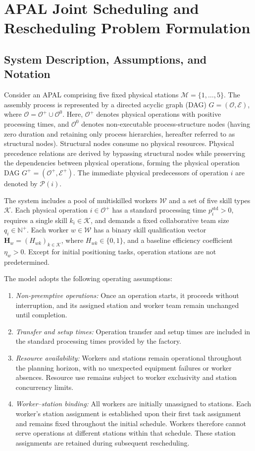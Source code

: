 \documentclass[journal,10pt]{IEEEtran}
\begin{document}
\section{APAL Joint Scheduling and Rescheduling Problem Formulation}\label{sec:formulation}

\subsection{System Description, Assumptions, and Notation}

Consider an APAL comprising five fixed physical stations $\mathcal{M}=\{1,\dots,5\}$. The assembly process is represented by a directed acyclic graph (DAG) $G=(\mathcal{O},\mathcal{E})$, where $\mathcal{O}=\mathcal{O}^+\cup\mathcal{O}^0$. Here, $\mathcal{O}^+$ denotes physical operations with positive processing times, and $\mathcal{O}^0$ denotes non-executable process-structure nodes (having zero duration and retaining only process hierarchies, hereafter referred to as structural nodes). Structural nodes consume no physical resources. Physical precedence relations are derived by bypassing structural nodes while preserving the dependencies between physical operations, forming the physical operation DAG $G^+=(\mathcal{O}^+,\mathcal{E}^+)$. The immediate physical predecessors of operation $i$ are denoted by $\mathcal{P}(i)$.

The system includes a pool of multiskilled workers $\mathcal{W}$ and a set of five skill types $\mathcal{K}$. Each physical operation $i\in\mathcal{O}^+$ has a standard processing time $p_i^{\mathrm{std}}>0$, requires a single skill $k_i\in\mathcal{K}$, and demands a fixed collaborative team size $q_i\in\mathbb{N}^+$. Each worker $w\in\mathcal{W}$ has a binary skill qualification vector $\mathbf{H}_w=(H_{wk})_{k\in\mathcal{K}}$, where $H_{wk}\in\{0,1\}$, and a baseline efficiency coefficient $\eta_w>0$. Except for initial positioning tasks, operation stations are not predetermined.

The model adopts the following operating assumptions:
\begin{enumerate}
\item \textit{Non-preemptive operations:} Once an operation starts, it proceeds without interruption, and its assigned station and worker team remain unchanged until completion.
\item \textit{Transfer and setup times:} Operation transfer and setup times are included in the standard processing times provided by the factory.
\item \textit{Resource availability:} Workers and stations remain operational throughout the planning horizon, with no unexpected equipment failures or worker absences. Resource use remains subject to worker exclusivity and station concurrency limits.
\item \textit{Worker--station binding:} All workers are initially unassigned to stations. Each worker's station assignment is established upon their first task assignment and remains fixed throughout the initial schedule. Workers therefore cannot serve operations at different stations within that schedule. These station assignments are retained during subsequent rescheduling.
\end{enumerate}
\end{document}
